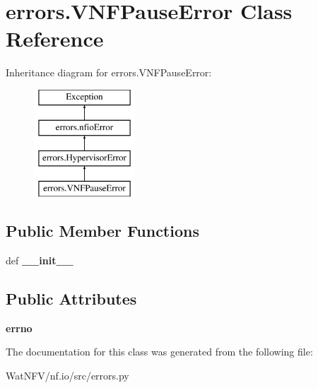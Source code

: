 \hypertarget{classerrors_1_1VNFPauseError}{\section{errors.\-V\-N\-F\-Pause\-Error Class Reference}
\label{classerrors_1_1VNFPauseError}
}
Inheritance diagram for errors.\-V\-N\-F\-Pause\-Error\-:\begin{figure}[H]
\begin{center}
\leavevmode
\includegraphics[height=4.000000cm]{classerrors_1_1VNFPauseError}
\end{center}
\end{figure}
\subsection*{Public Member Functions}
\begin{DoxyCompactItemize}
\item 
\hypertarget{classerrors_1_1VNFPauseError_af180dd953405832564b68629f76c0de2}{def {\bfseries \-\_\-\-\_\-init\-\_\-\-\_\-}}\label{classerrors_1_1VNFPauseError_af180dd953405832564b68629f76c0de2}

\end{DoxyCompactItemize}
\subsection*{Public Attributes}
\begin{DoxyCompactItemize}
\item 
\hypertarget{classerrors_1_1VNFPauseError_a410926f683c51832b1e9339b2acf8069}{{\bfseries errno}}\label{classerrors_1_1VNFPauseError_a410926f683c51832b1e9339b2acf8069}

\end{DoxyCompactItemize}


The documentation for this class was generated from the following file\-:\begin{DoxyCompactItemize}
\item 
Wat\-N\-F\-V/nf.\-io/src/errors.\-py\end{DoxyCompactItemize}
